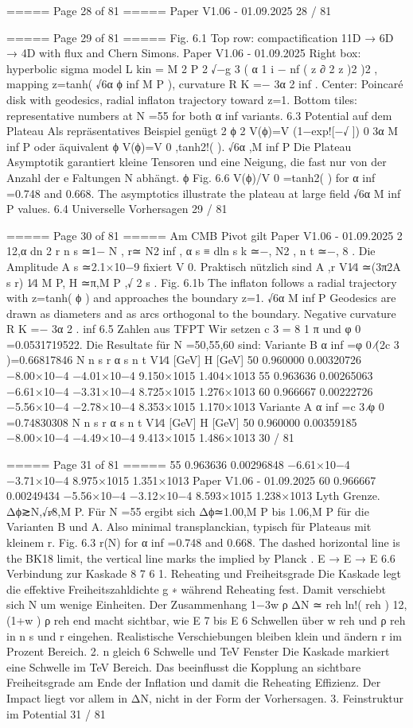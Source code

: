 \begin{MyVerbatim}
===== Page 28 of 81 =====
Paper V1.06 - 01.09.2025
28 / 81

===== Page 29 of 81 =====
Fig. 6.1 Top row: compactification 11D → 6D → 4D with flux and Chern Simons.
Paper V1.06 - 01.09.2025
Right box: hyperbolic sigma model L kin = M 2 P 2 √−g 3 ( α 1 i − nf ( z ∂ 2 z )2 )2 , mapping z=tanh( √6α ϕ inf M P ), curvature R K =− 3α 2 inf .
Center: Poincaré disk with geodesics, radial inflaton trajectory toward z=1. Bottom tiles: representative numbers at
N =55 for both α inf variants.
6.3 Potential auf dem Plateau
Als repräsentatives Beispiel genügt
2 ϕ 2
V(ϕ)=V (1−exp![−√ ])
0 3α M
inf P
oder äquivalent
ϕ
V(ϕ)=V
0
,tanh2!( ).
√6α ,M
inf P
Die Plateau Asymptotik garantiert kleine Tensoren und eine Neigung, die fast nur von der Anzahl der e Faltungen N
abhängt.
ϕ
Fig. 6.6 V(ϕ)/V 0 =tanh2( ) for α inf =0.748 and 0.668. The asymptotics illustrate the plateau at large field
√6α M
inf P
values.
6.4 Universelle Vorhersagen
29 / 81

===== Page 30 of 81 =====
Am CMB Pivot gilt
Paper V1.06 - 01.09.2025
2 12,α dn 2 r
n s ≃1− N , r≃ N2 inf , α s ≡ dln s k ≃−, N2 , n t ≃−, 8 .
Die Amplitude A s ≃2.1×10−9 fixiert V 0. Praktisch nützlich sind
A ,r
V1∕4 ≃(3π2A s r) 1∕4 M P, H ≃π,M P ,√ 2 s .
Fig. 6.1b The inflaton follows a radial trajectory with z=tanh( ϕ ) and approaches the boundary z=1.
√6α M
inf P
Geodesics are drawn as diameters and as arcs orthogonal to the boundary. Negative curvature R K =− 3α 2 .
inf
6.5 Zahlen aus TFPT
Wir setzen c 3 = 8 1 π und φ 0 =0.0531719522. Die Resultate für N =50,55,60 sind:
Variante B α inf =φ 0 ∕(2c 3 )=0.66817846
N n s r α s n t V1∕4 [GeV] H [GeV]
50 0.960000 0.00320726 −8.00×10−4 −4.01×10−4 9.150×1015 1.404×1013
55 0.963636 0.00265063 −6.61×10−4 −3.31×10−4 8.725×1015 1.276×1013
60 0.966667 0.00222726 −5.56×10−4 −2.78×10−4 8.353×1015 1.170×1013
Variante A α inf =c 3 ∕φ 0 =0.74830308
N n s r α s n t V1∕4 [GeV] H [GeV]
50 0.960000 0.00359185 −8.00×10−4 −4.49×10−4 9.413×1015 1.486×1013
30 / 81

===== Page 31 of 81 =====
55 0.963636 0.00296848 −6.61×10−4 −3.71×10−4 8.975×1015 1.351×1013
Paper V1.06 - 01.09.2025
60 0.966667 0.00249434 −5.56×10−4 −3.12×10−4 8.593×1015 1.238×1013
Lyth Grenze.
Δϕ≳N,√r∕8,M P. Für N =55 ergibt sich Δϕ≃1.00,M P bis 1.06,M P für die Varianten B und A. Also minimal
transplanckian, typisch für Plateaus mit kleinem r.
Fig. 6.3 r(N) for α inf =0.748 and 0.668. The dashed horizontal line is the BK18 limit, the vertical line marks the
implied by Planck .
E → E → E
6.6 Verbindung zur Kaskade
8 7 6
1. Reheating und Freiheitsgrade
Die Kaskade legt die effektive Freiheitszahldichte g ∗ während Reheating fest. Damit verschiebt sich N um wenige
Einheiten. Der Zusammenhang
1−3w ρ
ΔN ≃ reh ln!( reh )
12,(1+w ) ρ
reh end
macht sichtbar, wie E 7 bis E 6 Schwellen über w reh und ρ reh in n s und r eingehen. Realistische Verschiebungen bleiben
klein und ändern r im Prozent Bereich.
2. n gleich 6 Schwelle und TeV Fenster
Die Kaskade markiert eine Schwelle im TeV Bereich. Das beeinflusst die Kopplung an sichtbare Freiheitsgrade am Ende
der Inflation und damit die Reheating Effizienz. Der Impact liegt vor allem in ΔN, nicht in der Form der Vorhersagen.
3. Feinstruktur im Potential
31 / 81


\end{MyVerbatim}
